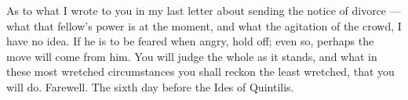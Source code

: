 

As to what I wrote to you in my last letter about sending the notice of divorce --- what that fellow's power is at the moment, and what the agitation of the crowd, I have no idea. If he is to be feared when angry, hold off; even so, perhaps the move will come from him. You will judge the whole as it stands, and what in these most wretched circumstances you shall reckon the least wretched, that you will do. Farewell. The sixth day before the Ides of Quintilis.
